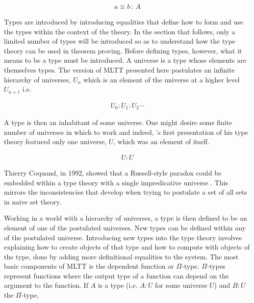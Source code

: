 \begin{align*}
    a \equiv b \, : \, A
\end{align*}

Types are introduced by introducing equalities that define how to form and use
the types within the context of the theory. In the section that follows, only a
limited number of types will be introduced so as to understand how the type
theory can be used in theorem proving. Before defining types, however, what it
means to be a type must be introduced. A universe is a type whose elements are
themselves types. The version of MLTT presented here postulates an infinite
hierarchy of universes, $U_{n}$ which is an element of the universe at a higher
level $U_{n+1}$ i.e.

\begin{align*}
    U_{0} : U_{1} : U_{2} \cdots
\end{align*}

A type is then an inhabitant of some universe. One might desire some finite
number of universes in which to work and indeed,
\mlt{}'s first presentation of his type theory featured only one universe,
$U$, which was an element of itself.

\begin{align*}
    U : U
\end{align*}

Thierry Coquand, in 1992, showed that a Russell-style paradox could be embedded
within a type theory with a single impredicative universe
\cite{coquand1992paradox}. This mirrors the
inconsistencies that develop when trying to postulate a set of all sets in naive
set theory.

Working in a world with a hierarchy of universes, a type is then defined to be an element of one of the postulated
universes. New  types can be defined within any of the postulated universe. Introducing new
types into the type theory involves explaining how to create objects of that
type and how to compute with objects of the type, done by adding more
definitional equalities to the system.  The most basic components of MLTT is the
dependent function or $\Pi$-type. $\Pi$-types represent functions where the
output type of a function can depend on the argument to the function.  If $A$ is
a type (i.e. $A : U$ for some universe $U$) and $B : U$  the $\Pi$-type,

